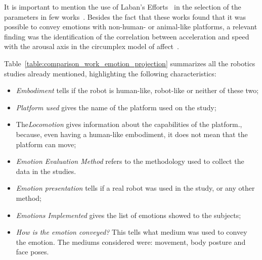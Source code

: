 It is important to mention the use of Laban’s Efforts~\cite{Laban1968} in the selection of the parameters in few works~\cite{BarakovaL10, Sharma2013}. Besides the fact that these works found that it was possible to convey emotions with non-human- or animal-like platforms, a relevant finding was the identification of the correlation between acceleration and speed with the arousal axis in the circumplex model of affect~\cite{Petta2010}.

Table~\ref{table:comparison_work_emotion_projection} summarizes all the robotics studies already mentioned, highlighting the following characteristics:
\begin{itemize}
	\item \textit{Embodiment} tells if the robot is human-like, robot-like or neither of these two;
	\item \textit{Platform used} gives the name of the platform used on the study;
	\item The\textit{Locomotion} gives information about the capabilities of the platform., because, even having a human-like embodiment, it does not mean that the platform can move;
	\item \textit{Emotion Evaluation Method} refers to the methodology used to collect the data in the studies.
	\item \textit{Emotion presentation} tells if a real robot was used in the study, or any other method;
	\item \textit{Emotions Implemented} gives the list of emotions showed to the subjects;
	\item \textit{How is the emotion conveyed?} This tells what medium was used to convey the emotion. The mediums considered were: movement, body posture and face poses.
\end{itemize}
\clearpage
